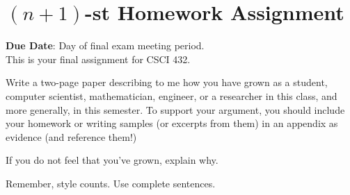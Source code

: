 \documentclass{article}
\begin{document}
\section*{$(n+1)$-st Homework Assignment}

{\bf{Due Date}}: Day of final exam meeting period.\\

This is your final assignment for CSCI 432.

Write a two-page paper describing to me how you have grown as a student,
computer
scientist, mathematician, engineer, or a researcher in this class, and more generally, in this
semester.  To support your argument, you should include your
homework or writing samples (or excerpts from them) in an appendix as
evidence (and reference them!)

If you do not feel that you've grown,
explain why.

Remember, style counts. Use complete sentences.
\end{document}
